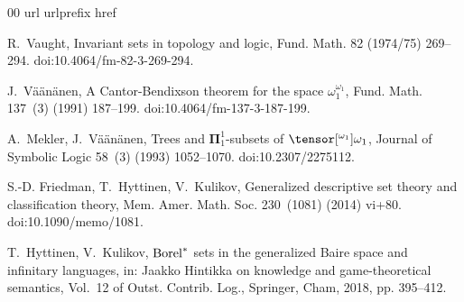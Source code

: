 \documentclass{amsart}
\numberwithin{equation}{section}
\newcommand{\pre}[2]{\tensor[^{#1}]{#2}{}}
\newcommand{\1}{\mathbf{I}}
\newcommand{\2}{\mathbf{II}}
\renewcommand{\o}{\omega}
\theoremstyle{definition}
\theoremstyle{remark}
\begin{document}

%

%

% 
%




\begin{thebibliography}{00}
\expandafter\ifx\csname url\endcsname\relax
  \def\url#1{\texttt{#1}}\fi
\expandafter\ifx\csname urlprefix\endcsname\relax\def\urlprefix{URL }\fi
\expandafter\ifx\csname href\endcsname\relax
  \def\href#1#2{#2} \def\path#1{#1}\fi



R.~Vaught, Invariant sets in topology and logic, Fund. Math. 82 (1974/75)
  269--294.
\newblock \href {https://doi.org/10.4064/fm-82-3-269-294}
  {\path{doi:10.4064/fm-82-3-269-294}}.

J.~Vä\"{a}n\"{a}nen, A {C}antor-{B}endixson theorem for the space
  {$\omega^{\omega_1}_1$}, Fund. Math. 137~(3) (1991) 187--199.
\newblock \href {https://doi.org/10.4064/fm-137-3-187-199}
  {\path{doi:10.4064/fm-137-3-187-199}}.

A.~Mekler, J.~V{\"a}{\"a}n{\"a}nen, Trees and $\boldsymbol{\Pi}_1^1$-subsets of
  $\pre{{\o_1}}{{\o_1}}$, Journal of Symbolic Logic 58~(3) (1993) 1052--1070.
\newblock \href {https://doi.org/10.2307/2275112} {\path{doi:10.2307/2275112}}.

S.-D. Friedman, T.~Hyttinen, V.~Kulikov, Generalized descriptive set theory and
  classification theory, Mem. Amer. Math. Soc. 230~(1081) (2014) vi+80.
\newblock \href {https://doi.org/10.1090/memo/1081}
  {\path{doi:10.1090/memo/1081}}.

T.~Hyttinen, V.~Kulikov, {${\rm Borel}^\ast$} sets in the generalized {B}aire
  space and infinitary languages, in: Jaakko {H}intikka on knowledge and
  game-theoretical semantics, Vol.~12 of Outst. Contrib. Log., Springer, Cham,
  2018, pp. 395--412.


\end{thebibliography}
\end{document}
